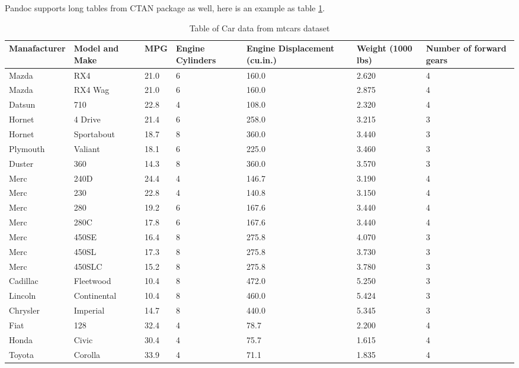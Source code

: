 Pandoc supports long tables from  CTAN package as well, here is an example as table \ref{table:6}.
\begin{longtable}{|p{2cm}|p{2.5cm}|p{1cm}|p{2cm}|p{2cm}|p{2cm}|p{1cm}|}
\caption{Table of Car data from mtcars dataset}
\label{table:6}\\
\hline
\textbf{Manafacturer} & \textbf{Model and Make} & \textbf{MPG} & \textbf{Engine Cylinders} & \textbf{Engine Displacement (cu.in.)} & \textbf{Weight (1000 lbs)} & \textbf{Number of forward gears} \\
\hline
Mazda &RX4         &  21.0  & 6 & 160.0 & 2.620 &   4\\ \hline
Mazda &RX4 Wag      & 21.0  & 6 & 160.0 & 2.875  &  4\\ \hline
Datsun &710         & 22.8  & 4 &108.0 &2.320   & 4\\ \hline
Hornet &4 Drive     & 21.4  & 6 &258.0 &3.215   & 3\\ \hline
Hornet &Sportabout  & 18.7  & 8 &360.0 &3.440   & 3\\ \hline
Plymouth      &   Valiant   &  18.1  & 6 &225.0 &3.460   & 3\\ \hline
Duster &360        &  14.3  & 8 &360.0 &3.570   & 3\\ \hline
Merc &240D         &  24.4  & 4 &146.7 &3.190   & 4\\ \hline
Merc &230         &   22.8  & 4 &140.8 &3.150   & 4\\ \hline
Merc &280          &  19.2  & 6 &167.6 &3.440   & 4\\ \hline
Merc &280C        &   17.8  & 6 &167.6 &3.440   & 4\\ \hline
Merc &450SE        &  16.4  & 8 &275.8 &4.070   & 3\\ \hline
Merc &450SL        &  17.3  & 8 &275.8 &3.730   & 3\\ \hline
Merc &450SLC       &  15.2  & 8 &275.8 &3.780   & 3\\ \hline
Cadillac &Fleetwood & 10.4  & 8 &472.0 &5.250   & 3\\ \hline
Lincoln &Continental& 10.4  & 8 &460.0 &5.424   & 3\\ \hline
Chrysler &Imperial  & 14.7  & 8 &440.0 &5.345   & 3\\ \hline
Fiat & 128          &  32.4 &  4 & 78.7 &2.200  &  4\\ \hline
Honda &Civic        & 30.4  & 4 & 75.7 &1.615   & 4\\ \hline
Toyota &Corolla     & 33.9  & 4 & 71.1 &1.835   & 4\\ \hline

\end{longtable}
